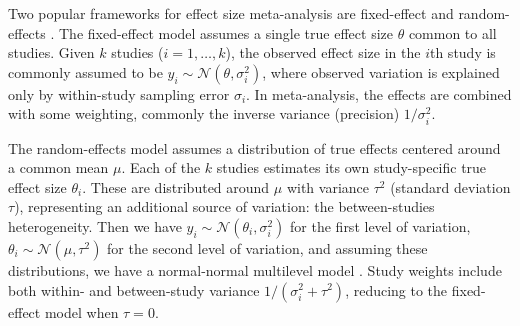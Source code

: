 %
%
%

Two popular frameworks for effect size meta-analysis are fixed-effect and random-effects \autocite{cohn2003HowMetaanalysisIncreases,borenstein2010BasicIntroductionFixedeffect}.
The fixed-effect model assumes a single true effect size $\theta$ common to all studies.
Given $k$ studies ($i = 1, \dots, k$), the observed effect size in the $i$th 
study is commonly assumed to be $y_i \sim \mathcal{N}(\theta,\sigma^2_i)$, where observed variation is explained only by within-study sampling error $\sigma_i$.
In meta-analysis, the effects are combined with some weighting, commonly the inverse variance (precision) $1/\sigma^2_i$.

The random-effects model assumes a distribution of true effects centered around a common mean $\mu$.
Each of the $k$ studies estimates its own study-specific true effect size $\theta_i$.
These are distributed around $\mu$ with variance $\tau^2$ (standard deviation $\tau$), representing an additional source of variation: the between-studies heterogeneity.
Then we have 
$y_i \sim \mathcal{N}(\theta_i,\sigma^2_i)$ for the first level of variation,
$\theta_i \sim \mathcal{N}(\mu,\tau^2)$ for the second level of variation,
and assuming these distributions, we have a normal-normal multilevel model \autocite{rover2017BayesianRandomeffectsMetaanalysis}.
Study weights include both within- and between-study variance $1/(\sigma^2_i + \tau^2)$, reducing to the fixed-effect model when $\tau=0$.

